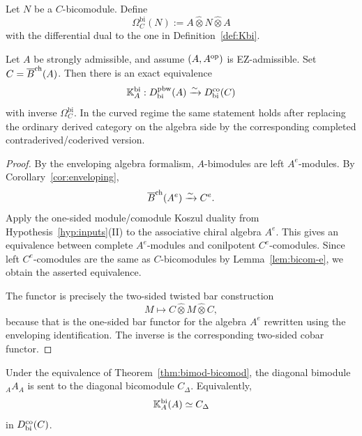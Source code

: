 \begin{definition}
Let $N$ be a $C$-bicomodule. Define
\[
\Omega_C^{\mathrm{bi}}(N):=A\widehat\otimes N\widehat\otimes A
\]
with the differential dual to the one in Definition~\ref{def:Kbi}.
\end{definition}

\begin{theorem}
Let $A$ be strongly admissible, and assume $(A,A^{\mathrm{op}})$ is EZ-admissible.
Set $C=\overline{B}^{\mathrm{ch}}(A)$.
Then there is an exact equivalence
\[
\mathbb{K}_A^{\mathrm{bi}}:D^{\mathrm{pbw}}_{\mathrm{bi}}(A)\xrightarrow{\sim}D^{\mathrm{co}}_{\mathrm{bi}}(C)
\]
with inverse $\Omega_C^{\mathrm{bi}}$. In the curved regime the same statement holds after replacing
the ordinary derived category on the algebra side by the corresponding completed
contra\-derived/coderived version.
\end{theorem}

\begin{proof}
By the enveloping algebra formalism, $A$-bimodules are left $A^e$-modules.
By Corollary~\ref{cor:enveloping},
\[
\overline{B}^{\mathrm{ch}}(A^e)\xrightarrow{\sim} C^e.
\]
Apply the one-sided module/comodule Koszul duality from Hypothesis~\ref{hyp:inputs}(II) to the
associative chiral algebra $A^e$. This gives an equivalence between complete $A^e$-modules and
conilpotent $C^e$-comodules. Since left $C^e$-comodules are the same as $C$-bicomodules by
Lemma~\ref{lem:bicom-e}, we obtain the asserted equivalence.

The functor is precisely the two-sided twisted bar construction
\[
M\longmapsto C\widehat\otimes M\widehat\otimes C,
\]
because that is the one-sided bar functor for the algebra $A^e$ rewritten using the enveloping
identification. The inverse is the corresponding two-sided cobar functor.
\end{proof}

\begin{theorem}
Under the equivalence of Theorem~\ref{thm:bimod-bicomod}, the diagonal bimodule ${}_A A_A$ is sent
to the diagonal bicomodule $C_\Delta$. Equivalently,
\[
\mathbb{K}_A^{\mathrm{bi}}(A)\simeq C_\Delta
\]
in $D^{\mathrm{co}}_{\mathrm{bi}}(C)$.
\end{theorem}

